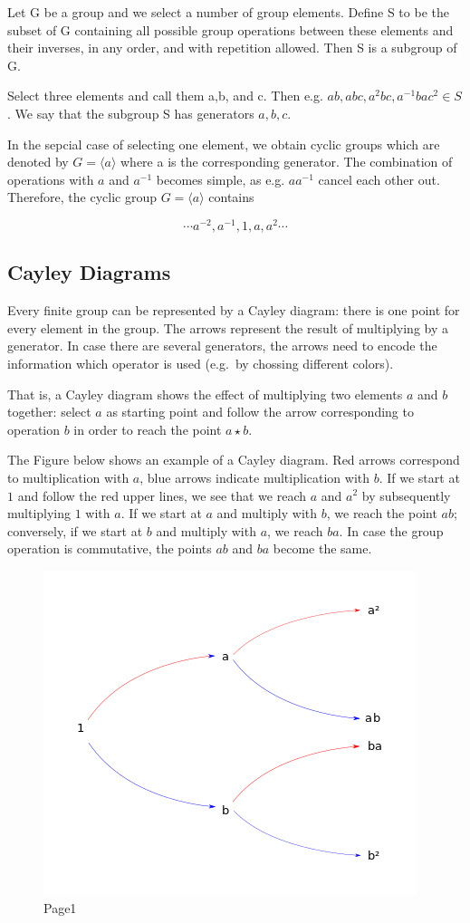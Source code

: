 
Let G be a group and we select a number of group elements. Define S to
be the subset of G containing all possible group operations between
these elements and their inverses, in any order, and with repetition
allowed. Then S is a subgroup of G.

Select three elements and call them a,b, and c. Then e.g.
\(ab, abc, a^2bc, a^{-1}b a c^2 \in S\). We say that the subgroup S has
generators \(a, b, c\).

In the sepcial case of selecting one element, we obtain cyclic groups
which are denoted by \(G = \langle a \rangle\) where a is the
corresponding generator. The combination of operations with \(a\) and
\(a^{-1}\) becomes simple, as e.g. \(a a^{-1}\) cancel each other out.
Therefore, the cyclic group \(G = \langle a \rangle\) contains

\[
\cdots a^{-2}, a^{-1}, 1, a, a^2 \cdots
\]

\subsection{Cayley Diagrams}\label{cayley-diagrams}

Every finite group can be represented by a Cayley diagram: there is one
point for every element in the group. The arrows represent the result of
multiplying by a generator. In case there are several generators, the
arrows need to encode the information which operator is used (e.g.~by
chossing different colors).

That is, a Cayley diagram shows the effect of multiplying two elements
\(a\) and \(b\) together: select \(a\) as starting point and follow the
arrow corresponding to operation \(b\) in order to reach the point
\(a \star b\).

The Figure below shows an example of a Cayley diagram. Red arrows
correspond to multiplication with \(a\), blue arrows indicate
multiplication with \(b\). If we start at \(1\) and follow the red upper
lines, we see that we reach \(a\) and \(a^2\) by subsequently
multiplying \(1\) with \(a\). If we start at \(a\) and multiply with
\(b\), we reach the point \(ab\); conversely, if we start at \(b\) and
multiply with \(a\), we reach \(ba\). In case the group operation is
commutative, the points \(ab\) and \(ba\) become the same.

\begin{figure}[H]
\centering
\includegraphics{images/groups_06_1.png}
\caption{Page1}
\end{figure}
